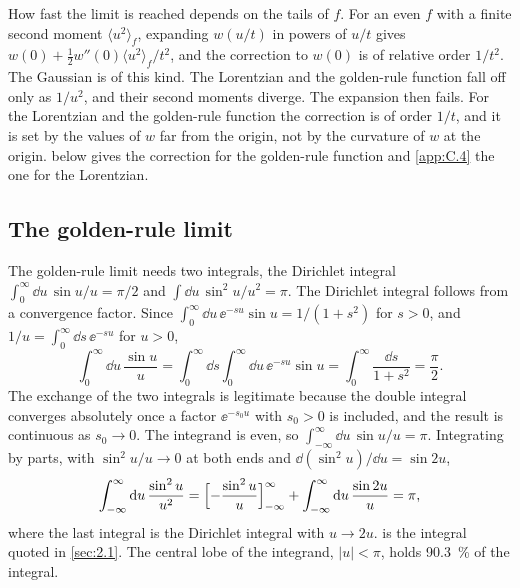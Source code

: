 How fast the limit is reached depends on the tails of $f$. For an even $f$ with a finite second moment $\langle u^2\rangle_f$, expanding $w(u/t)$ in powers of $u/t$ gives $w(0) + \tfrac12 w''(0)\langle u^2\rangle_f/t^2$, and the correction to $w(0)$ is of relative order $1/t^2$. The Gaussian is of this kind. The Lorentzian and the golden-rule function fall off only as $1/u^2$, and their second moments diverge. The expansion then fails. For the Lorentzian and the golden-rule function the correction is of order $1/t$, and it is set by the values of $w$ far from the origin, not by the curvature of $w$ at the origin.  below gives the correction for the golden-rule function and \cref{app:C.4} the one for the Lorentzian.

\subsection{The golden-rule limit}

The golden-rule limit needs two integrals, the Dirichlet integral $\int_0^\infty\dd u\,\sin u/u = \pi/2$ and $\int\dd u\,\sin^2u/u^2 = \pi$. The Dirichlet integral follows from a convergence factor. Since $\int_0^\infty\dd u\,\ee^{-su}\sin u = 1/(1 + s^2)$ for $s > 0$, and $1/u = \int_0^\infty\dd s\,\ee^{-su}$ for $u > 0$,
\begin{equation*}
  \int_0^\infty\dd u\,\frac{\sin u}{u} = \int_0^\infty\dd s\int_0^\infty\dd u\,\ee^{-su}\sin u = \int_0^\infty\frac{\dd s}{1 + s^2} = \frac{\pi}{2} .
\end{equation*}
The exchange of the two integrals is legitimate because the double integral converges absolutely once a factor $\ee^{-s_0u}$ with $s_0 > 0$ is included, and the result is continuous as $s_0 \to 0$. The integrand is even, so $\int_{-\infty}^\infty\dd u\,\sin u/u = \pi$. Integrating by parts, with $\sin^2u/u \to 0$ at both ends and $\dd(\sin^2u)/\dd u = \sin 2u$,
\begin{equation}
  \int_{-\infty}^{\infty}\mathrm{d} u\,\frac{\sin^2u}{u^2} = \Bigl[-\frac{\sin^2u}{u}\Bigr]_{-\infty}^{\infty} + \int_{-\infty}^{\infty}\mathrm{d} u\,\frac{\sin 2u}{u} = \pi ,
  \label{eq:C.1-sinsq}
\end{equation}
where the last integral is the Dirichlet integral with $u \to 2u$.  is the integral quoted in \cref{sec:2.1}. The central lobe of the integrand, $|u| < \pi$, holds \SI{90.3}{\percent} of the integral.

